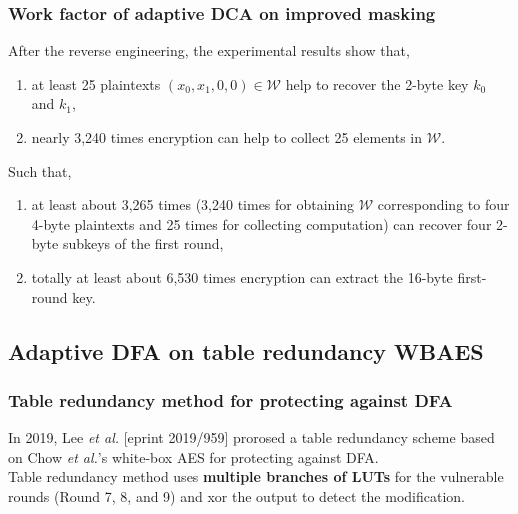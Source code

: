 \documentclass{beamer}
\begin{document}
\frame
{
	\frametitle{Work factor of adaptive DCA on improved masking}
	After the reverse engineering, the experimental results show that,
	\begin{enumerate}[1.]
		\item at least 25 plaintexts $(x_0,x_1,0,0)\in\mathcal{W}$ help to recover the 2-byte key $k_0$ and $k_1$,
		\item nearly 3,240 times encryption can help to collect 25 elements in $\mathcal{W}$.
	\end{enumerate}
	Such that,
	\begin{enumerate}[1.]
		\item at least about 3,265 times (3,240 times for obtaining $\mathcal{W}$
		corresponding to four 4-byte plaintexts and 25 times for collecting computation) can recover four 2-byte subkeys of the first round,
		\item totally at least about 6,530 times encryption can extract the 16-byte first-round key.
	\end{enumerate}
}

\subsection{Adaptive DFA on table redundancy WBAES}
\frame
{
	\frametitle{Table redundancy method for protecting against DFA}
	In 2019, Lee \textit{et al.} [eprint 2019/959] prorosed a table redundancy scheme based on Chow \textit{et al.}'s white-box AES for protecting against DFA.
	\\[2ex]
	Table redundancy method uses \textbf{multiple branches of LUTs} for the vulnerable rounds (Round 7, 8, and 9) and xor the output to detect the modification.
}
\end{document}
